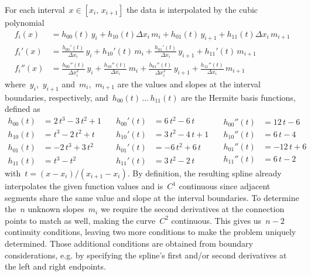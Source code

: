 For each interval~$x \in [x_{i},\,x_{i+1}]$ the data is interpolated by the cubic polynomial
%
\begin{align}
f_{i}(x) &= h_{00}(t)\,y_{i} + h_{10}(t)\Delta x_{i}\,m_{i} + h_{01}(t)\,y_{i+1} + h_{11}(t)\Delta x_{i}\,m_{i+1} \\
f_{i}'(x) &= \frac{h_{00}'(t)}{\Delta x_{i}}\,y_{i} + h_{10}'(t)\,m_{i} + \frac{h_{01}'(t)}{\Delta x_{i}}\,y_{i+1} + h_{11}'(t)\,m_{i+1} \\
f_{i}''(x) &= \frac{h_{00}''(t)}{\Delta x_{i}^2}\,y_{i} + \frac{h_{10}''(t)}{\Delta x_{i}}\,m_{i} + \frac{h_{01}''(t)}{\Delta x_{i}^2}\,y_{i+1} + \frac{h_{11}''(t)}{\Delta x_{i}}\,m_{i+1}
\end{align}
%
where~$y_{i}$,~$y_{i+1}$ and~$m_{i}$,~$m_{i+1}$ are the values and slopes at the interval boundaries, respectively, and~$h_{00}(t)\,\ldots\,h_{11}(t)$ are the Hermite basis functions, defined as
%
\begin{equation}
\begin{aligned}
h_{00}(t) &= 2\,t^3 - 3\,t^2 + 1 \\
h_{10}(t) &= t^3 - 2\,t^2 + t \\
h_{01}(t) &= -2\,t^3 + 3\,t^2 \\
h_{11}(t) &= t^3 - t^2
\end{aligned}
\quad
\begin{aligned}
h_{00}'(t) &= 6\,t^2 - 6\,t \\
h_{10}'(t) &= 3\,t^2 - 4\,t + 1 \\
h_{01}'(t) &= -6\,t^2 + 6\,t \\
h_{11}'(t) &= 3\,t^2 - 2\,t
\end{aligned}
\quad
\begin{aligned}
h_{00}''(t) &= 12\,t - 6 \\
h_{10}''(t) &= 6\,t - 4 \\
h_{01}''(t) &= -12\,t + 6 \\
h_{11}''(t) &= 6\,t - 2
\end{aligned}
\end{equation}
%
with~$t = (x - x_{i})/(x_{i+1} - x_{i})$. By definition, the resulting spline already interpolates the given function values and is~$C^1$ continuous since adjacent segments share the same value and slope at the interval boundaries.
To determine the~$n$ unknown slopes~$m_{i}$ we require the second derivatives at the connection points to match as well, making the curve~$C^2$ continuous. This gives us~$n-2$ continuity conditions, leaving two more conditions to make the problem uniquely determined.
Those additional conditions are obtained from boundary considerations, e.g. by specifying the spline's first and/or second derivatives at the left and right endpoints.

